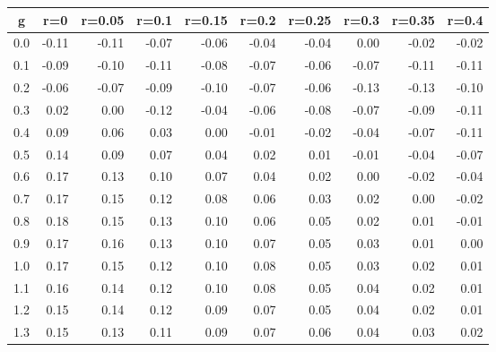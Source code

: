 %
\begin{table}[!tbp]
 \begin{center}
 \begin{tabular}{rrrrrrrrrr}\hline\hline
\multicolumn{1}{c}{g}&\multicolumn{1}{c}{r=0}&\multicolumn{1}{c}{r=0.05}&\multicolumn{1}{c}{r=0.1}&\multicolumn{1}{c}{r=0.15}&\multicolumn{1}{c}{r=0.2}&\multicolumn{1}{c}{r=0.25}&\multicolumn{1}{c}{r=0.3}&\multicolumn{1}{c}{r=0.35}&\multicolumn{1}{c}{r=0.4}\tabularnewline
\hline
0.0&-0.11&-0.11&-0.07&-0.06&-0.04&-0.04& 0.00&-0.02&-0.02\tabularnewline
0.1&-0.09&-0.10&-0.11&-0.08&-0.07&-0.06&-0.07&-0.11&-0.11\tabularnewline
0.2&-0.06&-0.07&-0.09&-0.10&-0.07&-0.06&-0.13&-0.13&-0.10\tabularnewline
0.3& 0.02& 0.00&-0.12&-0.04&-0.06&-0.08&-0.07&-0.09&-0.11\tabularnewline
0.4& 0.09& 0.06& 0.03& 0.00&-0.01&-0.02&-0.04&-0.07&-0.11\tabularnewline
0.5& 0.14& 0.09& 0.07& 0.04& 0.02& 0.01&-0.01&-0.04&-0.07\tabularnewline
0.6& 0.17& 0.13& 0.10& 0.07& 0.04& 0.02& 0.00&-0.02&-0.04\tabularnewline
0.7& 0.17& 0.15& 0.12& 0.08& 0.06& 0.03& 0.02& 0.00&-0.02\tabularnewline
0.8& 0.18& 0.15& 0.13& 0.10& 0.06& 0.05& 0.02& 0.01&-0.01\tabularnewline
0.9& 0.17& 0.16& 0.13& 0.10& 0.07& 0.05& 0.03& 0.01& 0.00\tabularnewline
1.0& 0.17& 0.15& 0.12& 0.10& 0.08& 0.05& 0.03& 0.02& 0.01\tabularnewline
1.1& 0.16& 0.14& 0.12& 0.10& 0.08& 0.05& 0.04& 0.02& 0.01\tabularnewline
1.2& 0.15& 0.14& 0.12& 0.09& 0.07& 0.05& 0.04& 0.02& 0.01\tabularnewline
1.3& 0.15& 0.13& 0.11& 0.09& 0.07& 0.06& 0.04& 0.03& 0.02\tabularnewline
\hline
\end{tabular}

\end{center}

\end{table}

